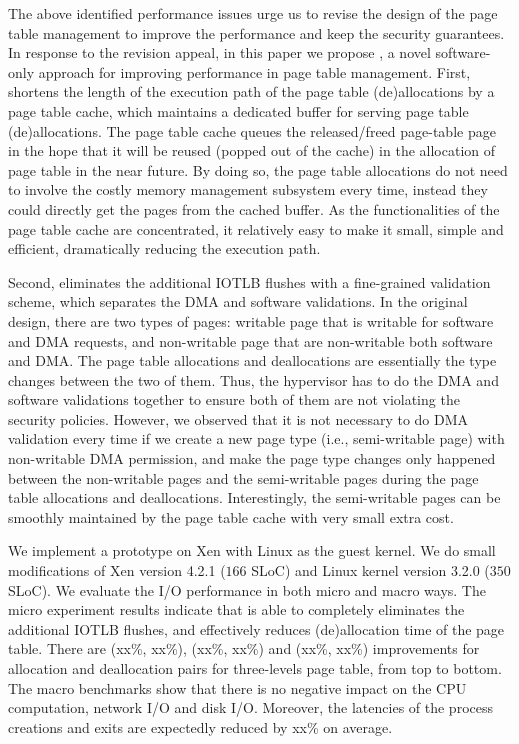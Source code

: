 The above identified performance issues urge us to revise the design of the page table management to improve the performance and keep the security guarantees. 
In response to the revision appeal, in this paper we propose \name, a novel software-only approach for improving performance in page table management. 
First, \name shortens the length of the execution path of the page table (de)allocations by a page table cache, which maintains a dedicated buffer for serving page table (de)allocations.
The page table cache queues the released/freed page-table page in the hope that 
it will be reused (popped out of the cache) in the allocation of page table in the near future.
By doing so, the page table allocations do not need to involve the costly memory management subsystem every time, instead they could directly get the pages from the cached buffer.
As the functionalities of the page table cache are concentrated, it relatively easy to make it small, simple and efficient, dramatically reducing the execution path.

Second, \name eliminates the additional IOTLB flushes with a fine-grained validation scheme, which separates the DMA and software validations.
In the original design, there are two types of pages: writable page that is writable for software and DMA requests, and non-writable page that are non-writable both software and DMA.
The page table allocations and deallocations are essentially the type changes between the two of them.
Thus, the hypervisor has to do the DMA and software validations together to ensure both of them are not violating the security policies.
However, we observed that it is not necessary to do DMA validation every time if we create a new page type (i.e., semi-writable page) with non-writable DMA permission, and make the page type changes only happened between the non-writable pages and the semi-writable pages during the page table allocations and deallocations. 
Interestingly, the semi-writable pages can be smoothly maintained by the page table cache with very small extra cost.

We implement a prototype on Xen with Linux as the guest kernel. We do small modifications of Xen version 4.2.1 ($166$ SLoC) and Linux kernel version 3.2.0 ($350$ SLoC).
We evaluate the I/O performance in both micro and macro ways.
The micro experiment results indicate that \name is able to completely eliminates the additional IOTLB flushes, and effectively reduces (de)allocation time of the page table. 
There are (xx\%, xx\%), (xx\%, xx\%) and (xx\%, xx\%) improvements for allocation and deallocation pairs for three-levels page table, from top to bottom.
The macro benchmarks show that there is no negative impact on the CPU computation, network I/O and disk I/O. 
Moreover, the latencies of the process creations and exits are expectedly reduced by xx\% on average. 


